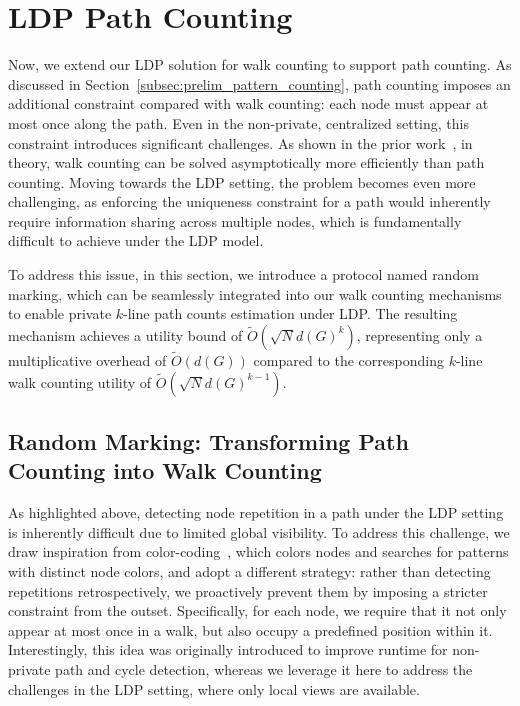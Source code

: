 \section{LDP Path Counting}
\label{sec:k-lp}

 
Now, we extend our LDP solution for walk counting to support path counting.  
As discussed in Section~\ref{subsec:prelim_pattern_counting}, path counting imposes an additional constraint compared with walk counting: each node must appear at most once along the path. 
Even in the non-private, centralized setting, this constraint introduces significant challenges.
As shown in the prior work~\cite{jokic2022number}, in theory, walk counting can be solved asymptotically more efficiently than path counting.
Moving towards the LDP setting, the problem becomes even more challenging, as enforcing the uniqueness constraint for a path would inherently require information sharing across multiple nodes, which is fundamentally difficult to achieve under the LDP model.


To address this issue, in this section, we introduce a protocol named random marking, which 
can be seamlessly integrated into our walk counting mechanisms to enable private $k$-line path counts estimation under LDP. 
The resulting mechanism achieves a utility bound of $\tilde{O}(\sqrt{N}d(G)^{k})$, representing only a multiplicative overhead of $\tilde{O}(d(G))$ compared to the corresponding $k$-line walk counting utility of $\tilde{O}(\sqrt{N}d(G)^{k-1})$.



\subsection{Random Marking: Transforming Path Counting into Walk Counting 
}
\label{subsec:k-lp_randommarking}




As highlighted above, detecting node repetition in a path under the LDP setting is inherently difficult due to limited global visibility. 
To address this challenge, {we draw inspiration from color-coding~\cite{alon1995color}, which colors nodes and searches for patterns with distinct node colors}, and adopt a different strategy: rather than detecting repetitions retrospectively, we proactively prevent them by imposing a stricter constraint from the outset.
Specifically, for each node, we require that it not only appear at most once in a walk, but also occupy a predefined position within it. 
{Interestingly, this idea was originally introduced to improve runtime for non-private path and cycle detection, whereas we leverage it here to address the challenges in the LDP setting, where only local views are available.}




